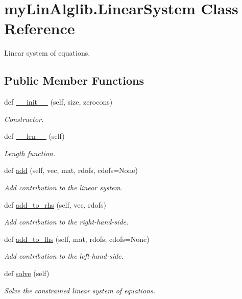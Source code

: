 \hypertarget{classmyLinAlglib_1_1LinearSystem}{}\section{my\+Lin\+Alglib.\+Linear\+System Class Reference}
\label{classmyLinAlglib_1_1LinearSystem}


Linear system of equations.  


\subsection*{Public Member Functions}
\begin{DoxyCompactItemize}
\item 
def \mbox{\hyperlink{classmyLinAlglib_1_1LinearSystem_abe0785c00795ca1bbf8539290e7287fc}{\+\_\+\+\_\+init\+\_\+\+\_\+}} (self, size, zerocons)
\begin{DoxyCompactList}\small\item\em Constructor. \end{DoxyCompactList}\item 
\mbox{\label{classmyLinAlglib_1_1LinearSystem_a3bc07f2b89dcb002ecce7f70a9fb0d61}} 
def \mbox{\hyperlink{classmyLinAlglib_1_1LinearSystem_a3bc07f2b89dcb002ecce7f70a9fb0d61}{\+\_\+\+\_\+len\+\_\+\+\_\+}} (self)
\begin{DoxyCompactList}\small\item\em Length function. \end{DoxyCompactList}\item 
def \mbox{\hyperlink{classmyLinAlglib_1_1LinearSystem_a5648c3ebda07e69cd72f2cdf79fb35c7}{add}} (self, vec, mat, rdofs, cdofs=None)
\begin{DoxyCompactList}\small\item\em Add contribution to the linear system. \end{DoxyCompactList}\item 
def \mbox{\hyperlink{classmyLinAlglib_1_1LinearSystem_a2d1c1a9e2b7de477055c641169443553}{add\+\_\+to\+\_\+rhs}} (self, vec, rdofs)
\begin{DoxyCompactList}\small\item\em Add contribution to the right-\/hand-\/side. \end{DoxyCompactList}\item 
def \mbox{\hyperlink{classmyLinAlglib_1_1LinearSystem_a43836f873d262926f7d563776d5d8198}{add\+\_\+to\+\_\+lhs}} (self, mat, rdofs, cdofs=None)
\begin{DoxyCompactList}\small\item\em Add contribution to the left-\/hand-\/side. \end{DoxyCompactList}\item 
def \mbox{\hyperlink{classmyLinAlglib_1_1LinearSystem_a9d3b8c2ae027f245d9fd9aaaeabdffcb}{solve}} (self)
\begin{DoxyCompactList}\small\item\em Solve the constrained linear system of equations. \end{DoxyCompactList}\end{DoxyCompactItemize}


